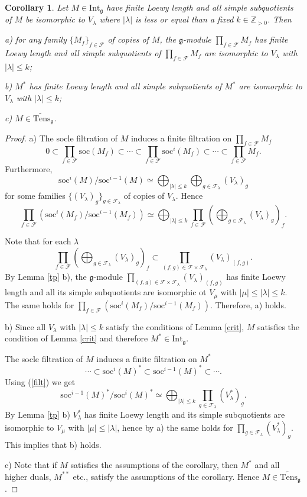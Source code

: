 \documentclass{birkmult}
\newcounter{theorem}
\newtheorem{corollary}[theo]{Corollary}
\renewcommand{\gg}{\mathfrak{g}}
\newcommand{\refle}[1]{Lemma \ref{#1}}
\newcommand{\Int}{\mathrm{Int}}
\newcommand{\lind}{\widetilde{\mathrm{Tens}}}
\newcommand{\soc}{\mathrm{soc}}
\begin{document}
\begin{corollary}\label{tens} Let $M\in\Int_\gg$ have finite Loewy
  length and all simple subquotients of $M$ be isomorphic to
  $V_\lambda$ where $|\lambda|$ is less or equal than a fixed
  $k\in\mathbb Z_{>0}$. Then

a) for any family $\{M_f\}_{f\in\mathcal F}$ of copies of $M$, the $\gg$-module $\prod_{f\in\mathcal F} M_f$ has finite Loewy length and all simple
subquotients of $\prod_{f\in\mathcal F} M_f$  are isomorphic to
  $V_\lambda$ with $|\lambda|\leq k$;

b) $M^*$ has finite Loewy length and  all simple
subquotients of $M^*$  are isomorphic to
  $V_\lambda$ with $|\lambda|\leq k$;

c) $M\in \lind_\gg$.

\end{corollary}
\begin{proof}
a) The socle filtration of $M$ induces a finite filtration on  $\prod_{f\in\mathcal F} M_f$
$$ 0\subset\prod_{f\in\mathcal F} \soc(M_f)\subset \cdots\subset
\prod_{f\in\mathcal F} \soc^i(M_f)\subset\cdots\subset
\prod_{f\in\mathcal F} M_f.$$
Furthermore,
\begin{equation}\label{filt}
\soc^i(M)/\soc^{i-1}(M)\simeq \bigoplus_{|\lambda|\leq
  k}\bigoplus_{g\in\mathcal F_{\lambda}} (V_\lambda)_g
\end{equation}
for some families $\{(V_\lambda)_g\}_{g\in\mathcal F _\lambda}$ of copies of $V_\lambda$. Hence
$$\prod_{f\in\mathcal F}(\soc^i(M_f)/\soc^{i-1}(M_f))\simeq\bigoplus_{|\lambda|\leq  k}
\prod_{f\in\mathcal F}(\bigoplus_{g\in\mathcal
  F_\lambda}(V_\lambda)_g)_f.$$

Note that for each $\lambda$
$$\prod_{f\in\mathcal F}(\bigoplus_{g\in\mathcal
  F_\lambda}(V_\lambda)_g)_f\subset \prod_{(f,g)\in\mathcal
  F\times\mathcal F_\lambda}(V_\lambda)_{(f,g)}.$$
By \refle{tp} b), the $\gg$-module $\prod_{(f,g)\in\mathcal F\times\mathcal F_\lambda}(V_\lambda)_{(f,g)}$ 
has finite Loewy length and all its simple subquotients are isomorphic
ot $V_\mu$ with $|\mu|\leq |\lambda|\leq k$. The same holds for
$\prod_{f\in\mathcal F} (\soc^i(M_f)/\soc^{i-1}(M_f))$.
Therefore, a) holds. 

b) Since all $V_\lambda$ with $|\lambda|\leq k$ satisfy the conditions
of \refle{crit}, $M$ satisfies the condition of \refle{crit} and
therefore $M^*\in\Int_\gg$.

The socle filtration of $M$ induces a finite filtration on $M^*$
$$\cdots\subset\soc^i(M)^*\subset\soc^{i-1}(M)^*\subset\cdots.$$
Using (\ref{filt}) we get
$$\soc^{i-1}(M)^*/\soc^{i}(M)^*\simeq\bigoplus_{|\lambda|\leq  k}
\prod_{g\in\mathcal F_\lambda}(V_\lambda^*)_g.$$
By \refle{tp} b) $V_\lambda^*$ has finite Loewy length and its simple
subquotients are isomorphic to $V_\mu$ with $|\mu|\leq |\lambda|$,
hence by a) the same holds for $\prod_{g\in\mathcal
  F_\lambda}(V_\lambda^*)_g$. 
This implies that b) holds.

c) Note that if $M$ satisfies the assumptions of the corollary, then
$M^*$ and all higher duals, $M^{**}$ etc., satisfy the assumptions of
the corollary. Hence $M\in\lind_\gg$.
\end{proof}
\end{document}
